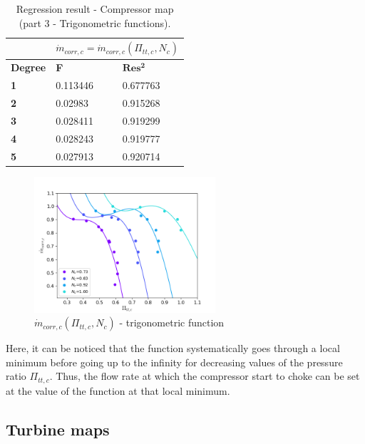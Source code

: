 \begin{longtable}[c]{@{}lll@{}}
\caption{Regression result - Compressor map (part 3 - Trigonometric functions).}
\label{tab:reg_compmap3}\\
\toprule
                & \multicolumn{2}{l}{$\dot{m}_{corr,c} = \dot{m}_{corr,c}(\Pi_{tt,c},N_c)$} \\* \midrule
\endfirsthead
%
\endhead
%
\bottomrule
\endfoot
%
\endlastfoot
%
\textbf{Degree} & \textbf{F}                       & $\mathbf{Res^2}$                       \\
\textbf{1}      & 0.113446                         & 0.677763                               \\
\textbf{2}      & 0.02983                          & 0.915268                               \\
\textbf{3}      & 0.028411                         & 0.919299                               \\
\textbf{4}      & 0.028243                         & 0.919777                               \\
\textbf{5}      & 0.027913                         & 0.920714                               \\* \bottomrule
\end{longtable}

\begin{figure}[h]
    \centering
    \includegraphics[width=0.6\textwidth]{Comp_map/calc_231_map_trigo.png}
    \caption{$\dot{m}_{corr,c}(\Pi_{tt,c},N_c)$ - trigonometric function}
    \label{fig:C7_trigo}
\end{figure}

Here, it can be noticed that the function systematically goes through a local minimum before going up to the infinity for decreasing values of the pressure ratio $\Pi_{tt,c}$. Thus, the flow rate at which the compressor start to choke can be set at the value of the function at that local minimum. 

\subsection{Turbine maps}


